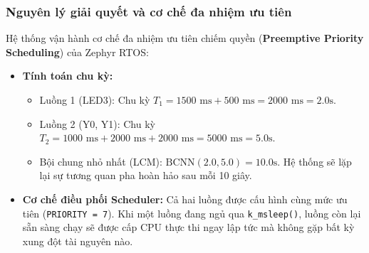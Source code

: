 \subsubsection{Nguyên lý giải quyết và cơ chế đa nhiệm ưu tiên}
Hệ thống vận hành cơ chế đa nhiệm ưu tiên chiếm quyền (\textbf{Preemptive Priority Scheduling}) của Zephyr RTOS:
\begin{itemize}
    \item \textbf{Tính toán chu kỳ:}
    \begin{itemize}
        \item Luồng 1 (LED3): Chu kỳ $T_1 = 1500\text{ ms} + 500\text{ ms} = 2000\text{ ms} = 2.0\text{s}$.
        \item Luồng 2 (Y0, Y1): Chu kỳ $T_2 = 1000\text{ ms} + 2000\text{ ms} + 2000\text{ ms} = 5000\text{ ms} = 5.0\text{s}$.
        \item Bội chung nhỏ nhất (LCM): $\text{BCNN}(2.0, 5.0) = 10.0\text{s}$. Hệ thống sẽ lặp lại sự tương quan pha hoàn hảo sau mỗi 10 giây.
    \end{itemize}
    \item \textbf{Cơ chế điều phối Scheduler:} Cả hai luồng được cấu hình cùng mức ưu tiên (\texttt{PRIORITY = 7}). Khi một luồng đang ngủ qua \texttt{k\_msleep()}, luồng còn lại sẵn sàng chạy sẽ được cấp CPU thực thi ngay lập tức mà không gặp bất kỳ xung đột tài nguyên nào.
\end{itemize}

